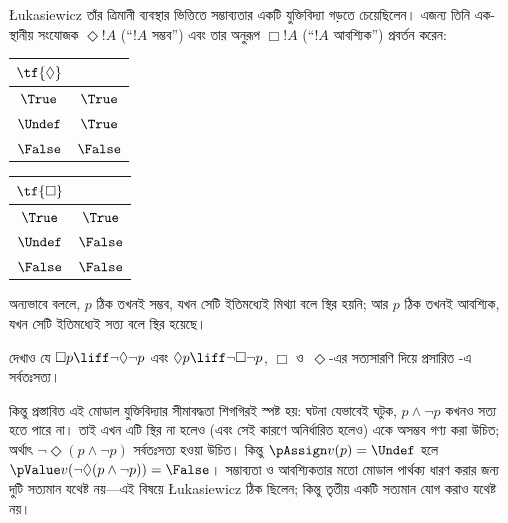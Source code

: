 \documentclass[../../../include/open-logic-section]{subfiles}
\begin{document}
\L ukasiewicz তাঁর ত্রিমানী ব্যবস্থার ভিত্তিতে সম্ভাব্যতার একটি যুক্তিবিদ্যা
গড়তে চেয়েছিলেন। এজন্য তিনি এক-স্থানীয় সংযোজক $\Diamond !A$
(“$!A$ সম্ভব”) এবং তার অনুরূপ $\Box !A$ (“$!A$ আবশ্যিক”) প্রবর্তন করেন:
\begin{center}
  \begin{tabular}{c|c}
    $\tf{\Diamond}$ & \\
    \hline
    $\True$ & $\True$ \\
    $\Undef$ & $\True$ \\
    $\False$ & $\False$
  \end{tabular}
  \quad
  \begin{tabular}{c|c}
    $\tf{\Box}$ & \\
    \hline
    $\True$ & $\True$ \\
    $\Undef$ & $\False$ \\
    $\False$ & $\False$
  \end{tabular}
\end{center}
অন্যভাবে বললে, $p$ ঠিক তখনই সম্ভব, যখন সেটি ইতিমধ্যেই মিথ্যা বলে স্থির
হয়নি; আর $p$ ঠিক তখনই আবশ্যিক, যখন সেটি ইতিমধ্যেই সত্য বলে স্থির হয়েছে।

\begin{prob}
  দেখাও যে $\Box p \liff \lnot\Diamond \lnot p$ এবং $\Diamond p \liff
  \lnot \Box \lnot p$, $\Box$ ও~$\Diamond$-এর সত্যসারণি দিয়ে প্রসারিত
  \LogLuk[3]-এ সর্বতঃসত্য।
\end{prob}

কিন্তু প্রস্তাবিত এই মোডাল যুক্তিবিদ্যার সীমাবদ্ধতা শিগগিরই স্পষ্ট হয়:
ঘটনা যেভাবেই ঘটুক, $p \land \lnot p$ কখনও সত্য হতে পারে না। তাই এখন
এটি স্থির না হলেও (এবং সেই কারণে অনির্ধারিত হলেও) একে অসম্ভব গণ্য করা
উচিত; অর্থাৎ $\lnot \Diamond(p \land \lnot p)$ সর্বতঃসত্য হওয়া উচিত।
কিন্তু $\pAssign v(p) = \Undef$ হলে
$\pValue v(\lnot \Diamond(p \land \lnot p)) = \False$। সম্ভাব্যতা ও
আবশ্যিকতার মতো মোডাল পার্থক্য ধারণ করার জন্য দুটি সত্যমান যথেষ্ট নয়—এই
বিষয়ে \L ukasiewicz ঠিক ছিলেন; কিন্তু তৃতীয় একটি সত্যমান যোগ করাও
যথেষ্ট নয়।
\end{document}
